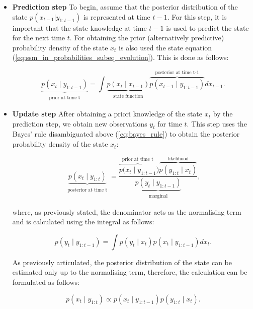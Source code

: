 \begin{itemize}
\item \textbf{Prediction step}
To begin, assume that the posterior distribution of the state \(p(x_{t-1}|y_{1:t-1})\) is represented at time \(t-1\). For this step, it is important that the state knowledge at time \(t-1\) is used to predict the state for the next time \(t\). For obtaining the prior (alternatively predictive) probability density of the state \(x_t\) is also used the state equation (\ref{eq:ssm_in_probabilities_subeq_evolution}). This is done as follows:

\begin{equation}
\underbrace{p(x_t \mid y_{1:t-1})}_{\substack{\text{prior at time t}}}
= \int\underbrace{p(x_t \mid x_{t-1})}_{\substack{\text{state function}}} \overbrace{p(x_{t-1} \mid y_{1:t-1})}^{\text{posterior at time t-1}} dx_{t-1}.
\label{eq:bayes_prediction_step}
\end{equation}

\item \textbf{Update step} After obtaining a priori knowledge of the state \(x_t\) by the prediction step, we obtain new observations \(y_t\) for time \(t\). This step uses the Bayes' rule disambiguated above (\ref{eq:bayes_rule}) to obtain the posterior probability density of the state \(x_t\):

\begin{equation}
\underbrace{p(x_t \mid y_{1:t})}_{\substack{\text{posterior at time t}}}
= \frac{\overbrace{p(x_t \mid y_{1:t-1}}^{\text{prior at time t}}) \overbrace{p(y_{1:t} \mid x_t)}^{\text{likelihood}}}{\underbrace{p(y_t \mid y_{1:t-1})}_{\substack{\text{marginal}}}},
\label{eq:bayes_update_step}
\end{equation}

\noindent where, as previously stated, the denominator acts as the normalising term and is calculated using the integral as follows:

\begin{equation}
p(y_t \mid y_{1:t-1}) = \int p(y_t \mid x_t) p(x_t \mid y_{1:t-1}) dx_t. 
\label{eq:bayes_rule_denominator}
\end{equation}

As previously articulated, the posterior distribution of the state can be estimated only up to the normalising term, therefore, the calculation can be formulated as follows:

\begin{equation}
p(x_t \mid y_{1:t}) \propto p(x_t \mid y_{1:t-1}) p(y_{1:t} \mid x_t).
\end{equation}
\end{itemize}

